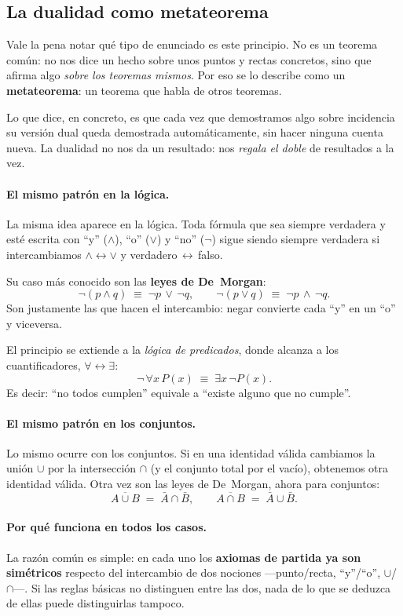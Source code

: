 \documentclass[11pt,a4paper]{article}
\begin{document}
\subsection{La dualidad como metateorema}

Vale la pena notar qué tipo de enunciado es este principio. No es un
teorema común: no nos dice un hecho sobre unos puntos y rectas concretos,
sino que afirma algo \emph{sobre los teoremas mismos}. Por eso se lo
describe como un \textbf{metateorema}: un teorema que habla de otros
teoremas.

Lo que dice, en concreto, es que cada vez que demostramos algo sobre
incidencia su versión dual queda demostrada automáticamente, sin hacer
ninguna cuenta nueva. La dualidad no nos da un resultado: nos
\emph{regala el doble} de resultados a la vez.

\paragraph{El mismo patrón en la lógica.}
La misma idea aparece en la lógica. Toda fórmula que sea siempre verdadera
y esté escrita con ``y'' ($\wedge$), ``o'' ($\vee$) y ``no'' ($\neg$)
sigue siendo siempre verdadera si intercambiamos $\wedge\leftrightarrow\vee$
y verdadero$\,\leftrightarrow\,$falso.

Su caso más conocido son las \textbf{leyes de De~Morgan}:
\[
  \neg(p\wedge q)\;\equiv\;\neg p\,\vee\,\neg q,
  \qquad
  \neg(p\vee q)\;\equiv\;\neg p\,\wedge\,\neg q.
\]
Son justamente las que hacen el intercambio: negar convierte cada ``y'' en
un ``o'' y viceversa.

El principio se extiende a la \emph{lógica de predicados}, donde alcanza a
los cuantificadores, $\forall\leftrightarrow\exists$:
\[
  \neg\,\forall x\,P(x)\;\equiv\;\exists x\,\neg P(x).
\]
Es decir: ``no todos cumplen'' equivale a ``existe alguno que no cumple''.

\paragraph{El mismo patrón en los conjuntos.}
Lo mismo ocurre con los conjuntos. Si en una identidad válida cambiamos la
unión $\cup$ por la intersección $\cap$ (y el conjunto total por el
vacío), obtenemos otra identidad válida. Otra vez son las leyes de
De~Morgan, ahora para conjuntos:
\[
  \overline{A\cup B}\;=\;\bar A\cap\bar B,
  \qquad
  \overline{A\cap B}\;=\;\bar A\cup\bar B.
\]

\paragraph{Por qué funciona en todos los casos.}
La razón común es simple: en cada uno los \textbf{axiomas de partida ya son
simétricos} respecto del intercambio de dos nociones —punto/recta,
``y''/``o'', $\cup$/$\cap$—. Si las reglas básicas no distinguen entre las
dos, nada de lo que se deduzca de ellas puede distinguirlas tampoco.
\end{document}

